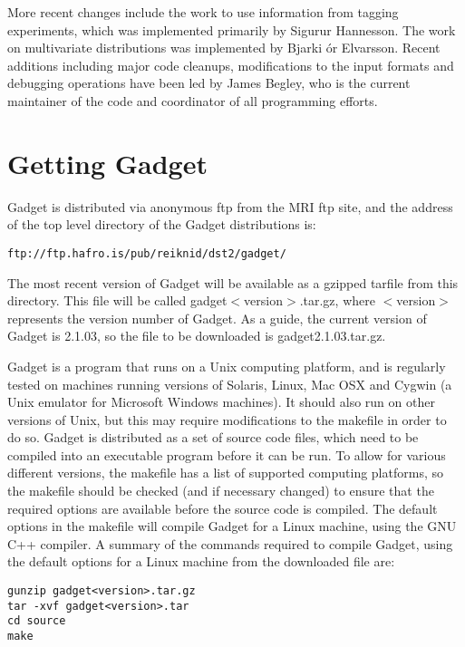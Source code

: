 \documentclass[10pt,twoside]{book}
\begin{document}
\bigskip
More recent changes include the work to use information from tagging experiments, which was implemented primarily by Sigur{\dh}ur Hannesson.  The work on multivariate distributions was implemented by Bjarki {\TH}\'{o}r Elvarsson.  Recent additions including major code cleanups, modifications to the input formats and debugging operations have been led by James Begley, who is the current maintainer of the code and coordinator of all programming efforts.

\section{Getting Gadget}\label{sec:gettinggadget}
Gadget is distributed via anonymous ftp from the MRI ftp site, and the address of the top level directory of the Gadget distributions is:

{\small\begin{verbatim}
ftp://ftp.hafro.is/pub/reiknid/dst2/gadget/
\end{verbatim}}

The most recent version of Gadget will be available as a gzipped tarfile from this directory.  This file will be called gadget$<$version$>$.tar.gz, where $<$version$>$ represents the version number of Gadget.  As a guide, the current version of Gadget is 2.1.03, so the file to be downloaded is gadget2.1.03.tar.gz.

\bigskip
Gadget is a program that runs on a Unix computing platform, and is regularly tested on machines running versions of Solaris, Linux, Mac OSX and Cygwin (a Unix emulator for Microsoft Windows machines).  It should also run on other versions of Unix, but this may require modifications to the makefile in order to do so.  Gadget is distributed as a set of source code files, which need to be compiled into an executable program before it can be run.  To allow for various different versions, the makefile has a list of supported computing platforms, so the makefile should be checked (and if necessary changed) to ensure that the required options are available before the source code is compiled.  The default options in the makefile will compile Gadget for a Linux machine, using the GNU C++ compiler.  A summary of the commands required to compile Gadget, using the default options for a Linux machine from the downloaded file are:

{\small\begin{verbatim}
gunzip gadget<version>.tar.gz
tar -xvf gadget<version>.tar
cd source
make
\end{verbatim}}
\end{document}
